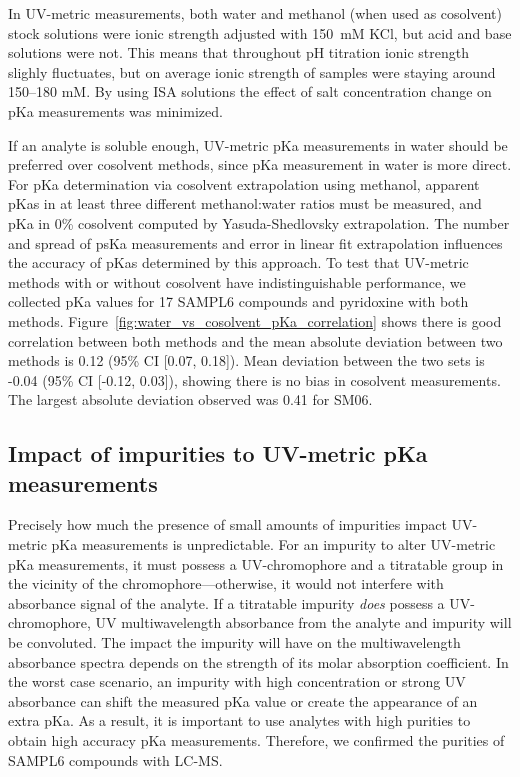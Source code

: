 \documentclass[9pt,lineno]{elife}
\begin{document}
In UV-metric measurements, both water and methanol (when used as cosolvent) stock solutions were ionic strength adjusted with 150~mM KCl, but acid and base solutions were not. This means that throughout pH titration ionic strength slighly fluctuates, but on average ionic strength of samples were staying around 150--180 mM. By using ISA solutions the effect of salt concentration change on pKa measurements was minimized.

If an analyte is soluble enough, UV-metric pKa measurements in water should be preferred over cosolvent methods, since pKa measurement in water is more direct. 
For pKa determination via cosolvent extrapolation using methanol, apparent pKas in at least three different methanol:water ratios must be measured, and pKa in 0\% cosolvent computed by Yasuda-Shedlovsky extrapolation. 
The number and spread of psKa measurements and error in linear fit extrapolation influences the accuracy of pKas determined by this approach. 
To test that UV-metric methods with or without cosolvent have indistinguishable performance, we collected pKa values for 17 SAMPL6 compounds and pyridoxine with both methods. 
Figure~\ref{fig:water_vs_cosolvent_pKa_correlation} shows there is good correlation between both methods and the mean absolute deviation between two methods is 0.12 (95\% CI [0.07, 0.18]). Mean deviation between the two sets is -0.04 (95\% CI [-0.12, 0.03]), showing there is no bias in cosolvent measurements. The largest absolute deviation observed was 0.41 for SM06. 


\subsection{Impact of impurities to UV-metric pKa measurements}

Precisely how much the presence of small amounts of impurities impact UV-metric pKa measurements is unpredictable. 
For an impurity to alter UV-metric pKa measurements, it must possess a UV-chromophore and a titratable group in the vicinity of the chromophore---otherwise, it would not interfere with absorbance signal of the analyte. 
If a titratable impurity \emph{does} possess a UV-chromophore, UV multiwavelength absorbance from the analyte and impurity will be convoluted. 
The impact the impurity will have on the multiwavelength absorbance spectra depends on the strength of its molar absorption coefficient. 
In the worst case scenario, an impurity with high concentration or strong UV absorbance can shift the measured pKa value or create the appearance of an extra pKa. As a result, it is important to use analytes with high purities to obtain high accuracy pKa measurements. 
Therefore, we confirmed the purities of SAMPL6 compounds with LC-MS.   
\end{document}
